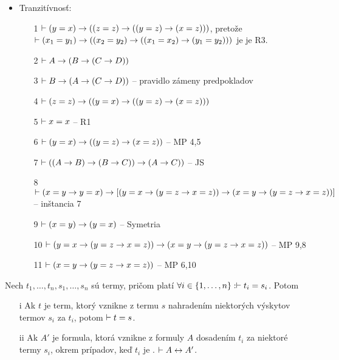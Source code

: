\begin{dokaz}
\begin{itemize}
    \item Tranzitívnosť:
        \begin{itemize}
            \item[1] $\vdash (y=x) \rightarrow ((z=z) \rightarrow
                ((y=z) \rightarrow (x=z)))$, pretože \\
                $\vdash (x_1 = y_1) \rightarrow ((x_2=y_2) \rightarrow
                 ((x_1=x_2) \rightarrow (y_1=y_2)))$ je je R3.
            \item[2] $\vdash A \rightarrow (B \rightarrow (C \rightarrow D))$
            \item[3] $\vdash B \rightarrow (A \rightarrow (C \rightarrow D))$
                -- pravidlo zámeny predpokladov
            \item[4] $\vdash (z=z) \rightarrow ((y=x) \rightarrow ((y=z) \rightarrow
                (x=z)))$
            \item[5] $\vdash x=x$ -- R1
            \item[6] $\vdash (y=x) \rightarrow ((y=z) \rightarrow (x=z))$
                -- MP 4,5
            \item[7] $\vdash ((A \rightarrow B) \rightarrow (B \rightarrow
                C)) \rightarrow (A \rightarrow C))$ -- JS
            \item[8] $\vdash (x=y \rightarrow y=x) \rightarrow [
                (y=x \rightarrow (y=z \rightarrow x=z)) \rightarrow
                (x=y \rightarrow (y=z \rightarrow x=z))]$ -- inštancia 7
            \item[9] $\vdash (x=y) \rightarrow (y=x)$ -- Symetria
            \item[10] $\vdash
                (y=x \rightarrow (y=z \rightarrow x=z)) \rightarrow
                (x=y \rightarrow (y=z \rightarrow x=z))$ -- MP 9,8
            \item[11] $\vdash (x=y \rightarrow (y=z \rightarrow x=z))$ -- MP 6,10
        \end{itemize}
\end{itemize}
\end{dokaz}

\begin{veta}
    Nech $t_1,\ldots,t_n,s_1,\ldots,s_n$ sú termy, pričom platí
        $\forall i \in \{1,\dots,n\}: \vdash t_i = s_i$.
    Potom
    \begin{itemize}
    \item[i] Ak $t$ je term, ktorý vznikne z termu $s$ nahradením
        niektorých výskytov termov $s_i$ za $t_i$, potom 
        $\vdash t=s$.
    \item[ii] Ak $A'$ je formula, ktorá vznikne z formuly $A$
    dosadením $t_i$ za niektoré termy $s_i$, okrem prípadov, keď
    $t_i$ je \fixme{}.
    $\vdash A \leftrightarrow A'$.
    \end{itemize}
\end{veta}
